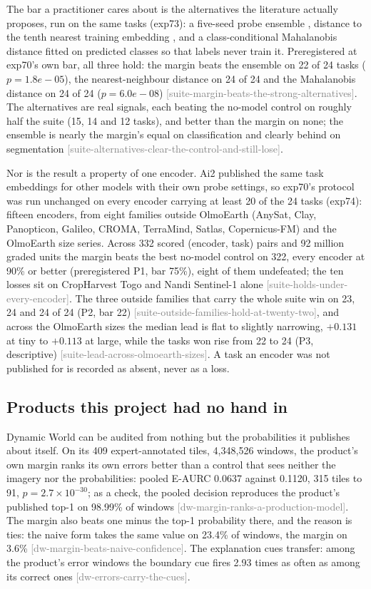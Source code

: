 \documentclass[11pt,a4paper]{article}
\newcommand{\claim}[1]{{\scriptsize\textsf{\textcolor{gray}{[#1]}}}}
\begin{document}
The bar a practitioner cares about is the alternatives the literature actually
proposes, run on the same tasks (exp73): a five-seed probe ensemble
\citep{lakshminarayanan2017}, distance to the tenth nearest training embedding
\citep{sun2022}, and a class-conditional Mahalanobis distance \citep{lee2018}
fitted on predicted classes so that labels never train it. Preregistered at
exp70's own bar, all three hold: the margin beats the ensemble on 22 of
24 tasks ($p = 1.8e-05$), the nearest-neighbour distance on 24 of 24
and the Mahalanobis distance on 24 of 24 ($p = 6.0e-08$)
\claim{suite-margin-beats-the-strong-alternatives}. The alternatives are real
signals, each beating the no-model control on roughly half the suite (15,
14 and 12 tasks), and better than the margin on none;
the ensemble is nearly the margin's equal on classification and clearly behind on
segmentation \claim{suite-alternatives-clear-the-control-and-still-lose}.

Nor is the result a property of one encoder. Ai2 published the same task
embeddings for other models with their own probe settings, so exp70's protocol
was run unchanged on every encoder carrying at least 20 of the 24 tasks
(exp74): fifteen encoders, from eight families outside OlmoEarth (AnySat, Clay,
Panopticon, Galileo, CROMA, TerraMind, Satlas, Copernicus-FM) and the OlmoEarth
size series. Across 332 scored (encoder, task) pairs and 92 million graded
units the margin beats the best no-model control on 322, every encoder at
90\% or better (preregistered P1, bar 75\%), eight of them undefeated; the ten
losses sit on CropHarvest Togo and Nandi Sentinel-1 alone
\claim{suite-holds-under-every-encoder}. The three outside families that carry
the whole suite win on 23, 24 and 24 of 24 (P2, bar 22)
\claim{suite-outside-families-hold-at-twenty-two}, and across the OlmoEarth
sizes the median lead is flat to slightly narrowing, $+0.131$ at tiny to
$+0.113$ at large, while the tasks won rise from 22 to 24 (P3, descriptive)
\claim{suite-lead-across-olmoearth-sizes}. A task an encoder was not published
for is recorded as absent, never as a loss.

\subsection{Products this project had no hand in}

Dynamic World can be audited from nothing but the probabilities it publishes
about itself. On its 409 expert-annotated tiles, 4,348,526 windows, the product's
own margin ranks its own errors better than a control that sees neither the
imagery nor the probabilities: pooled E-AURC 0.0637 against 0.1120, 315 tiles to
91, $p = 2.7\times10^{-30}$; as a check, the pooled decision reproduces the
product's published top-1 on 98.99\% of windows \claim{dw-margin-ranks-a-production-model}.
The margin also beats one minus the top-1 probability there, and the reason is
ties: the naive form takes the same value on 23.4\% of windows, the margin on
3.6\% \claim{dw-margin-beats-naive-confidence}. The explanation cues transfer:
among the product's error windows the boundary cue fires 2.93 times as often as
among its correct ones \claim{dw-errors-carry-the-cues}.
\end{document}
